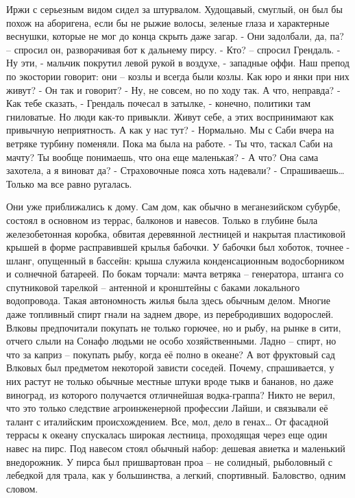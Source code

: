 \documentclass[10pt,final]{book}
\begin{document}
Иржи с серьезным видом сидел за штурвалом. Худощавый, смуглый, он был бы похож на аборигена, если бы не рыжие волосы, зеленые глаза и характерные веснушки, которые не мог до конца скрыть даже загар.
- Они задолбали, да, па? -- спросил он, разворачивая бот к дальнему пирсу.
- Кто? -- спросил Грендаль.
- Ну эти, - мальчик покрутил левой рукой в воздухе, - западные оффи. Наш препод по экостории говорит: они -- козлы и всегда были козлы. Как юро и янки при них живут?
- Он так и говорит?
- Ну, не совсем, но по ходу так. А что, неправда?
- Как тебе сказать, - Грендаль почесал в затылке, - конечно, политики там гниловатые. Но люди как-то привыкли. Живут себе, а этих воспринимают как привычную неприятность. А как у нас тут?
- Нормально. Мы с Саби вчера на ветряке турбину поменяли. Пока ма была на работе.
- Ты что, таскал Саби на мачту? Ты вообще понимаешь, что она еще маленькая?
- А что? Она сама захотела, а я виноват да?
- Страховочные пояса хоть надевали?
- Спрашиваешь\ldots{} Только ма все равно ругалась.

Они уже приближались к дому. Сам дом, как обычно в меганезийском субурбе, состоял в основном из террас, балконов и навесов. Только в глубине была железобетонная коробка, обвитая деревянной лестницей и накрытая пластиковой крышей в форме расправившей крылья бабочки. У бабочки был хоботок, точнее - шланг, опущенный в бассейн: крыша служила конденсационным водосборником и солнечной батареей. По бокам торчали: мачта ветряка -- генератора, штанга со спутниковой тарелкой -- антенной и кронштейны с баками локального водопровода. Такая автономность жилья была здесь обычным делом. Многие даже топливный спирт гнали на заднем дворе, из перебродивших водорослей. Влковы предпочитали покупать не только горючее, но и рыбу, на рынке в сити, отчего слыли на Сонафо людьми не особо хозяйственными. Ладно -- спирт, но что за каприз -- покупать рыбу, когда её полно в океане? А вот фруктовый сад Влковых был предметом некоторой зависти соседей. Почему, спрашивается, у них растут не только обычные местные штуки вроде тыкв и бананов, но даже виноград, из которого получается отличнейшая водка-граппа? Никто не верил, что это только следствие агроинженерной профессии Лайши, и связывали её талант с италийским происхождением. Все, мол, дело в генах\ldots{} От фасадной террасы к океану спускалась широкая лестница, проходящая через еще один навес на пирс. Под навесом стоял обычный набор: дешевая авиетка и маленький внедорожник. У пирса был пришвартован проа -- не солидный, рыболовный с лебедкой для трала, как у большинства, а легкий, спортивный. Баловство, одним словом.
\end{document}
